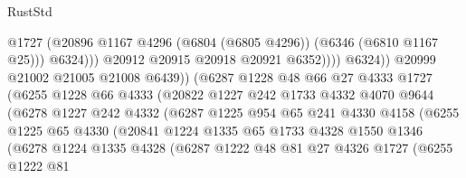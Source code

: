 \begin{lexlean}{RustStd}
\begin{coremodule}
                                        @1727
                                        (@20896
                                          @1167
                                          @4296
                                          (@6804 (@6805 @4296))
                                          (@6346 (@6810 @1167 @25)))
                                        @6324)))
                                  @20912
                                  @20915
                                  @20918
                                  @20921
                                  @6352))))
                          @6324))
                      @20999
                      @21002
                      @21005
                      @21008
                      @6439))
                  (@6287
                    @1228
                    @48
                    @66
                    @27
                    @4333
                    @1727
                    (@6255
                      @1228
                      @66
                      @4333
                      (@20822
                        @1227
                        @242
                        @1733
                        @4332
                        @4070
                        @9644
                        (@6278
                          @1227
                          @242
                          @4332
                          (@6287
                            @1225
                            @954
                            @65
                            @241
                            @4330
                            @4158
                            (@6255
                              @1225
                              @65
                              @4330
                              (@20841
                                @1224
                                @1335
                                @65
                                @1733
                                @4328
                                @1550
                                @1346
                                (@6278
                                  @1224
                                  @1335
                                  @4328
                                  (@6287
                                    @1222
                                    @48
                                    @81
                                    @27
                                    @4326
                                    @1727
                                    (@6255
                                      @1222
                                      @81

\end{coremodule}
\end{lexlean}
